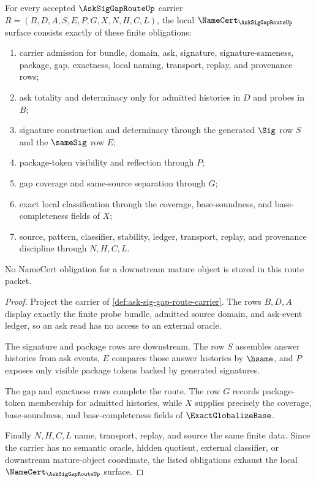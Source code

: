 \begin{theorem}
\label{thm:ask-sig-gap-route-namecert-obligations}
For every accepted $\AskSigGapRouteUp$ carrier $R=(B,D,A,S,E,P,G,X,N,H,C,L)$, the local $\NameCert_{\AskSigGapRouteUp}$ surface consists exactly of these finite obligations:
\begin{enumerate}
\item carrier admission for bundle, domain, ask, signature, signature-sameness, package, gap, exactness, local naming, transport, replay, and provenance rows;
\item ask totality and determinacy only for admitted histories in $D$ and probes in $B$;
\item signature construction and determinacy through the generated $\Sig$ row $S$ and the $\sameSig$ row $E$;
\item package-token visibility and reflection through $P$;
\item gap coverage and same-source separation through $G$;
\item exact local classification through the coverage, base-soundness, and base-completeness fields of $X$;
\item source, pattern, classifier, stability, ledger, transport, replay, and provenance discipline through $N,H,C,L$.
\end{enumerate}
No NameCert obligation for a downstream mature object is stored in this route packet.
\end{theorem}
\begin{proof}
Project the carrier of \autoref{def:ask-sig-gap-route-carrier}. The rows $B,D,A$ display exactly the finite probe bundle, admitted source domain, and ask-event ledger, so an ask read has no access to an external oracle.

The signature and package rows are downstream. The row $S$ assembles answer histories from ask events, $E$ compares those answer histories by $\hsame$, and $P$ exposes only visible package tokens backed by generated signatures.

The gap and exactness rows complete the route. The row $G$ records package-token membership for admitted histories, while $X$ supplies precisely the coverage, base-soundness, and base-completeness fields of $\ExactGlobalizeBase$.

Finally $N,H,C,L$ name, transport, replay, and source the same finite data. Since the carrier has no semantic oracle, hidden quotient, external classifier, or downstream mature-object coordinate, the listed obligations exhaust the local $\NameCert_{\AskSigGapRouteUp}$ surface.
\end{proof}

